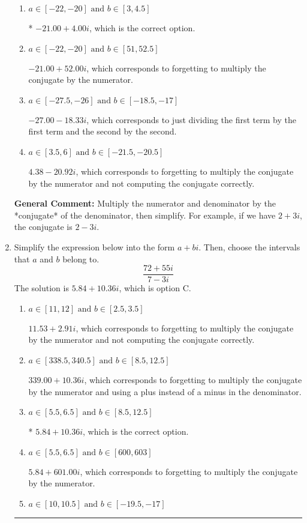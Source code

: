 \documentclass{extbook}[14pt]
\newcommand{\litem}[1]{\item #1

\rule{\textwidth}{0.4pt}}
\begin{document}
\begin{enumerate}
{\begin{enumerate}[label=\Alph*.]
 $-273.00  + 4.00 i$, which corresponds to forgetting to multiply the conjugate by the numerator and using a plus instead of a minus in the denominator.
\item \( a \in [-22, -20] \text{ and } b \in [3, 4.5] \)

* $-21.00  + 4.00 i$, which is the correct option.
\item \( a \in [-22, -20] \text{ and } b \in [51, 52.5] \)

 $-21.00  + 52.00 i$, which corresponds to forgetting to multiply the conjugate by the numerator.
\item \( a \in [-27.5, -26] \text{ and } b \in [-18.5, -17] \)

 $-27.00  - 18.33 i$, which corresponds to just dividing the first term by the first term and the second by the second.
\item \( a \in [3.5, 6] \text{ and } b \in [-21.5, -20.5] \)

 $4.38  - 20.92 i$, which corresponds to forgetting to multiply the conjugate by the numerator and not computing the conjugate correctly.
\end{enumerate}

\textbf{General Comment:} Multiply the numerator and denominator by the *conjugate* of the denominator, then simplify. For example, if we have $2+3i$, the conjugate is $2-3i$.
}
\litem{
Simplify the expression below into the form $a+bi$. Then, choose the intervals that $a$ and $b$ belong to.
\[ \frac{72 + 55 i}{7 - 3 i} \]The solution is \( 5.84  + 10.36 i \), which is option C.\begin{enumerate}[label=\Alph*.]
\item \( a \in [11, 12] \text{ and } b \in [2.5, 3.5] \)

 $11.53  + 2.91 i$, which corresponds to forgetting to multiply the conjugate by the numerator and not computing the conjugate correctly.
\item \( a \in [338.5, 340.5] \text{ and } b \in [8.5, 12.5] \)

 $339.00  + 10.36 i$, which corresponds to forgetting to multiply the conjugate by the numerator and using a plus instead of a minus in the denominator.
\item \( a \in [5.5, 6.5] \text{ and } b \in [8.5, 12.5] \)

* $5.84  + 10.36 i$, which is the correct option.
\item \( a \in [5.5, 6.5] \text{ and } b \in [600, 603] \)

 $5.84  + 601.00 i$, which corresponds to forgetting to multiply the conjugate by the numerator.
\item \( a \in [10, 10.5] \text{ and } b \in [-19.5, -17] \)


\end{enumerate}}
\end{enumerate}
\end{document}
